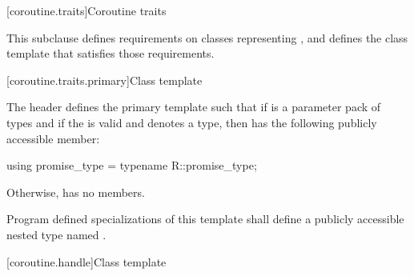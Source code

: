 [coroutine.traits]{Coroutine traits}

\pnum
This subclause defines requirements on classes representing
,
and defines the class template
that satisfies those requirements.

[coroutine.traits.primary]{Class template }

\pnum 
The header  defines the primary template
 such that 
if  is a parameter pack of types and 
if the   is valid and
denotes a type,
then  has the following publicly
accessible member:

\begin{codeblock}
  using promise_type = typename R::promise_type;
\end{codeblock}

Otherwise,  has no members.

\pnum
Program defined specializations of this template shall define a publicly
accessible nested type named .

[coroutine.handle]{Class template }


